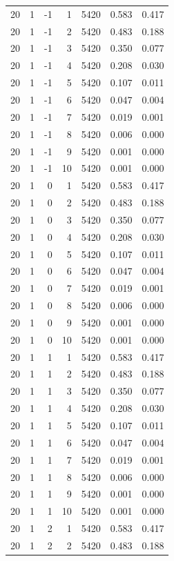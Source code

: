\begin{table}
\begin{tabular}{rrrrrrr}
20 & 1 & -1 & 1 & 5420 & 0.583 & 0.417 \\
20 & 1 & -1 & 2 & 5420 & 0.483 & 0.188 \\
20 & 1 & -1 & 3 & 5420 & 0.350 & 0.077 \\
20 & 1 & -1 & 4 & 5420 & 0.208 & 0.030 \\
20 & 1 & -1 & 5 & 5420 & 0.107 & 0.011 \\
20 & 1 & -1 & 6 & 5420 & 0.047 & 0.004 \\
20 & 1 & -1 & 7 & 5420 & 0.019 & 0.001 \\
20 & 1 & -1 & 8 & 5420 & 0.006 & 0.000 \\
20 & 1 & -1 & 9 & 5420 & 0.001 & 0.000 \\
20 & 1 & -1 & 10 & 5420 & 0.001 & 0.000 \\
20 & 1 & 0 & 1 & 5420 & 0.583 & 0.417 \\
20 & 1 & 0 & 2 & 5420 & 0.483 & 0.188 \\
20 & 1 & 0 & 3 & 5420 & 0.350 & 0.077 \\
20 & 1 & 0 & 4 & 5420 & 0.208 & 0.030 \\
20 & 1 & 0 & 5 & 5420 & 0.107 & 0.011 \\
20 & 1 & 0 & 6 & 5420 & 0.047 & 0.004 \\
20 & 1 & 0 & 7 & 5420 & 0.019 & 0.001 \\
20 & 1 & 0 & 8 & 5420 & 0.006 & 0.000 \\
20 & 1 & 0 & 9 & 5420 & 0.001 & 0.000 \\
20 & 1 & 0 & 10 & 5420 & 0.001 & 0.000 \\
20 & 1 & 1 & 1 & 5420 & 0.583 & 0.417 \\
20 & 1 & 1 & 2 & 5420 & 0.483 & 0.188 \\
20 & 1 & 1 & 3 & 5420 & 0.350 & 0.077 \\
20 & 1 & 1 & 4 & 5420 & 0.208 & 0.030 \\
20 & 1 & 1 & 5 & 5420 & 0.107 & 0.011 \\
20 & 1 & 1 & 6 & 5420 & 0.047 & 0.004 \\
20 & 1 & 1 & 7 & 5420 & 0.019 & 0.001 \\
20 & 1 & 1 & 8 & 5420 & 0.006 & 0.000 \\
20 & 1 & 1 & 9 & 5420 & 0.001 & 0.000 \\
20 & 1 & 1 & 10 & 5420 & 0.001 & 0.000 \\
20 & 1 & 2 & 1 & 5420 & 0.583 & 0.417 \\
20 & 1 & 2 & 2 & 5420 & 0.483 & 0.188 \\

\end{tabular}
\end{table}
